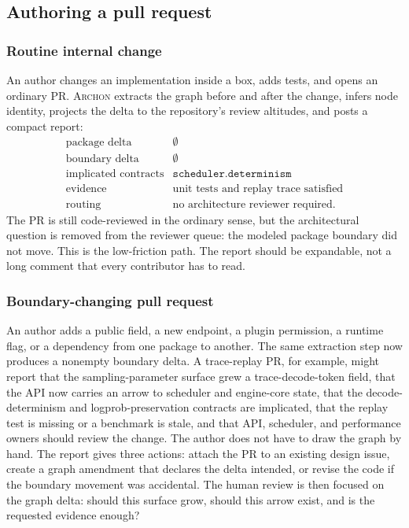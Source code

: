 \documentclass[sigconf,review,anonymous]{acmart}
\theoremstyle{plain}
\theoremstyle{definition}
\begin{document}
\subsection{Authoring a pull request}

\subsubsection{Routine internal change}

An author changes an implementation inside a box, adds tests, and opens an
ordinary PR. \textsc{Archon} extracts the graph before and after the change,
infers node identity, projects the delta to the repository's review altitudes,
and posts a compact report:
\[
\begin{array}{ll}
\text{package delta} & \emptyset\\
\text{boundary delta} & \emptyset\\
\text{implicated contracts} & \texttt{scheduler.determinism}\\
\text{evidence} & \text{unit tests and replay trace satisfied}\\
\text{routing} & \text{no architecture reviewer required.}
\end{array}
\]
The PR is still code-reviewed in the ordinary sense, but the architectural
question is removed from the reviewer queue: the modeled package boundary did
not move. This is the low-friction path. The report should be expandable, not a
long comment that every contributor has to read.

\subsubsection{Boundary-changing pull request}

An author adds a public field, a new endpoint, a plugin permission, a runtime
flag, or a dependency from one package to another. The same extraction step now
produces a nonempty boundary delta. A trace-replay PR, for example, might report
that the sampling-parameter surface grew a trace-decode-token field,
that the API now carries an arrow to scheduler and engine-core state, that the
decode-determinism and logprob-preservation contracts are implicated, that the
replay test is missing or a benchmark is stale, and that API, scheduler, and
performance owners should review the change.
The author does not have to draw the graph by hand. The report gives three
actions: attach the PR to an existing design issue, create a graph amendment
that declares the delta intended, or revise the code if the boundary movement was
accidental. The human review is then focused on the graph delta: should this
surface grow, should this arrow exist, and is the requested evidence enough?
\end{document}
